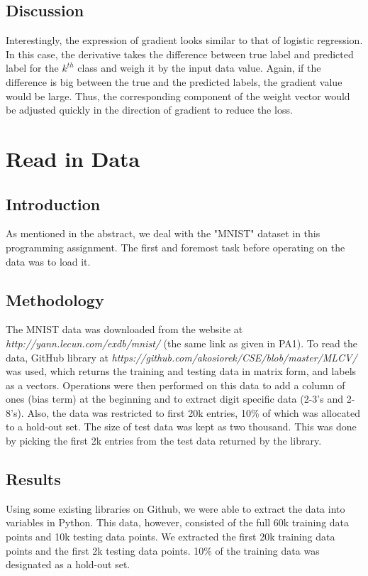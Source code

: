 \documentclass{article}
\begin{document}
\subsection{Discussion}
Interestingly, the expression of gradient looks similar to that of logistic regression. In this case, the derivative takes the difference between true label and predicted label for the $k^{th}$ class and weigh it by the input data value. Again, if the difference is big between the true and the predicted labels, the gradient value would be large. Thus, the corresponding component of the weight vector would be adjusted quickly in the direction of gradient to reduce the loss.

\newpage
\section{Read in Data}

\subsection{Introduction}
As mentioned in the abstract, we deal with the "MNIST" dataset in this programming assignment. The first and foremost task before operating on the data was to load it. 

\subsection{Methodology}
The MNIST data was downloaded from the website at \emph{http://yann.lecun.com/exdb/mnist/} (the same link as given in PA1). To read the data, GitHub library at \emph{https://github.com/akosiorek/CSE/blob/master/MLCV/} was used, which returns the training and testing data in matrix form, and labels as a vectors. Operations were then performed on this data to add a column of ones (bias term) at the beginning and to extract digit specific data (2-3's and 2-8's). Also, the data was restricted to first 20k entries, 10\% of which was allocated to a hold-out set. The size of test data was kept as two thousand. This was done by picking the first 2k entries from the test data returned by the library.

\subsection{Results}
Using some existing libraries on Github, we were able to extract the data into variables in Python. This data, however, consisted of the full 60k training data points and 10k testing data points. We extracted the first 20k training data points and the first 2k testing data points. 10\% of the training data was designated as a hold-out set.
\end{document}
